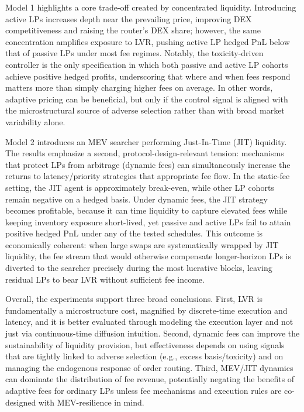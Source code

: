 \documentclass[11pt]{article}
\begin{document}
Model 1 highlights a core trade-off created by concentrated liquidity. Introducing active LPs increases depth near 
the prevailing price, improving DEX competitiveness and raising the router’s DEX share; however, the same concentration 
amplifies exposure to LVR, pushing active LP hedged PnL below that of passive LPs under most fee regimes. Notably, 
the toxicity-driven controller is the only specification in which both passive and active LP cohorts achieve positive 
hedged profits, underscoring that where and when fees respond matters more than simply charging higher fees on average. 
In other words, adaptive pricing can be beneficial, but only if the control signal is aligned with the microstructural 
source of adverse selection rather than with broad market variability alone.

Model 2 introduces an MEV searcher performing Just-In-Time (JIT) liquidity. The results emphasize a second, 
protocol-design-relevant tension: mechanisms that protect LPs from arbitrage (dynamic fees) can simultaneously increase 
the returns to latency/priority strategies that appropriate fee flow. In the static-fee setting, the JIT agent is 
approximately break-even, while other LP cohorts remain negative on a hedged basis. Under dynamic fees, the JIT strategy 
becomes profitable, because it can time liquidity to capture elevated fees while keeping inventory exposure short-lived, 
yet passive and active LPs fail to attain positive hedged PnL under any of the tested schedules. This outcome is 
economically coherent: when large swaps are systematically wrapped by JIT liquidity, the fee stream that would otherwise 
compensate longer-horizon LPs is diverted to the searcher precisely during the most lucrative blocks, leaving residual 
LPs to bear LVR without sufficient fee income.

Overall, the experiments support three broad conclusions. First, LVR is fundamentally a microstructure cost, magnified 
by discrete-time execution and latency, and it is better evaluated through modeling the execution layer and not just 
via continuous-time diffusion intuition. Second, dynamic fees can improve the sustainability of liquidity provision, 
but effectiveness depends on using signals that are tightly linked to adverse selection (e.g., excess basis/toxicity) 
and on managing the endogenous response of order routing. Third, MEV/JIT dynamics can dominate the distribution of 
fee revenue, potentially negating the benefits of adaptive fees for ordinary LPs unless fee mechanisms and execution 
rules are co-designed with MEV-resilience in mind.
\end{document}
